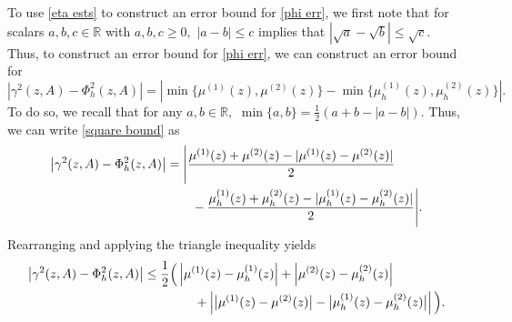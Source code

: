 To use \eqref{eta ests} to construct an error bound for \eqref{phi err}, we first note that for scalars $a, b, c \in \mathbb{R}$ with $a, b, c \ge 0,$ $|a-b| \le c$ implies that $|\sqrt{a} - \sqrt{b}| \le \sqrt{c}.$ Thus, to construct an error bound for \eqref{phi err}, we can construct an error bound for
\begin{equation} \label{square bound}
    | \gamma^2(z, A) - \Phi_h^2(z, A)| = \left| \min \{ \mu^{(1)}(z), \mu^{(2)}(z)\}  - \min \{ \mu_h^{(1)}(z), \mu_h^{(2)}(z)\} \right|.
\end{equation}
To do so, we recall that for any $a, b \in \mathbb{R},$ $\min\{a, b\} = \frac{1}{2}(a + b - |a-b|).$
Thus, we can write \eqref{square bound} as
\begin{align}
    \left| \gamma^2(z,A) - \Phi_h^2(z,A) \right|
    &= \Bigg|
    \frac{\mu^{(1)}(z)+\mu^{(2)}(z)
    -|\mu^{(1)}(z)-\mu^{(2)}(z)|}{2} \notag\\
    &\qquad -
    \frac{\mu_h^{(1)}(z)+\mu_h^{(2)}(z)
    -|\mu_h^{(1)}(z)-\mu_h^{(2)}(z)|}{2}
    \Bigg|.
\end{align}
Rearranging and applying the triangle inequality yields
\begin{align}
    \left| \gamma^2(z,A) - \Phi_h^2(z,A) \right|
    &\leq \frac{1}{2} \Big(
    \left|\mu^{(1)}(z)-\mu_h^{(1)}(z)\right|
    + \left|\mu^{(2)}(z)-\mu_h^{(2)}(z)\right| \notag\\
    &\qquad\qquad
    + \left|
    \bigl|\mu^{(1)}(z)-\mu^{(2)}(z)\bigr|
    - \bigl|\mu_h^{(1)}(z)-\mu_h^{(2)}(z)\bigr|
    \right|
    \Big).
\end{align}
